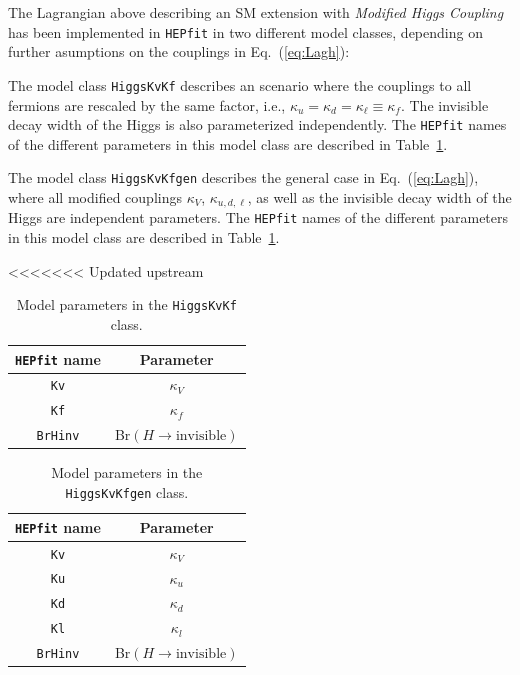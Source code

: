 \documentclass[preprint,3p,12pt]{elsarticle}
\newcommand{\HEPfit}{\texttt{HEPfit}\xspace}
\begin{document}
{The Lagrangian above describing an SM extension with {\it Modified Higgs Coupling} has been implemented in {\tt HEPfit} in two different model classes, depending on further asumptions on the couplings in Eq.~(\ref{eq:Lagh}):
%
\begin{itemize}
{\item The model class {\tt HiggsKvKf} describes an scenario where the couplings to all fermions are rescaled by the same factor, i.e., $\kappa_u=\kappa_d=\kappa_\ell \equiv \kappa_f$. The invisible decay width of the Higgs is also parameterized independently. The {\tt HEPfit} names of the different parameters in this model class are described in Table~\ref{tab:HiggsKvKfpars}.}
%
{\item The model class {\tt HiggsKvKfgen} describes the general case in Eq.~(\ref{eq:Lagh}), where all modified couplings $\kappa_V$, $\kappa_{u, d, \ell}$, as well as the invisible decay width of the Higgs are independent parameters. The {\tt HEPfit} names of the different parameters in this model class are described in Table~\ref{tab:HiggsKvKfpars}.
}
%
\end{itemize}
%
<<<<<<< Updated upstream
\begin{table}[tb]
 \centering
 \caption{Model parameters in the {\tt HiggsKvKf} class. }\vspace{0.2cm}
  \begin{tabular}{| c c | }
\hline
%
\textbf{\HEPfit name}&
\textbf{Parameter}\\
%
\hline
 {\tt Kv}&
$\kappa_V$\\
%
 {\tt Kf}&
$\kappa_f$\\
%
 {\tt BrHinv}&
Br$(H\to \mathrm{invisible})$\\
\hline
  \end{tabular}
 \label{tab:HiggsKvKfpars}
\end{table} 

 \begin{table}[tb]
 \centering
 \caption{Model parameters in the {\tt HiggsKvKfgen} class.}\vspace{0.2cm}
  \begin{tabular}{| c c | }
\hline
%
\textbf{\HEPfit name}&
\textbf{Parameter}\\
%
\hline
 {\tt Kv}&
$\kappa_V$\\
%
 {\tt Ku}&
$\kappa_u$\\
%
 {\tt Kd}&
$\kappa_d$\\
%
 {\tt Kl}&
$\kappa_l$\\
%
 {\tt BrHinv}&
Br$(H\to \mathrm{invisible})$\\
\hline
  \end{tabular}
 \label{tab:HiggsKvKfgenpars}
\end{table} 

}
\end{document}
